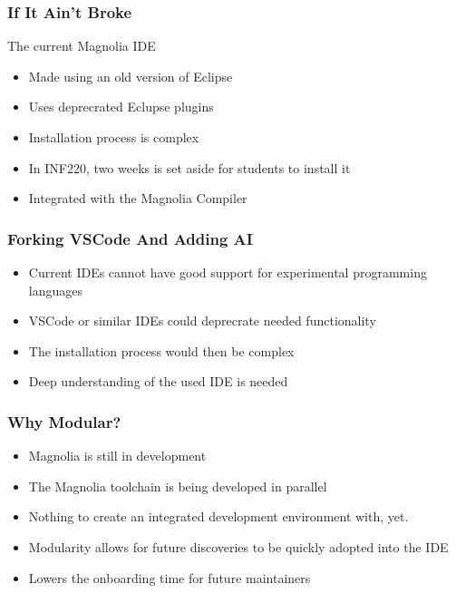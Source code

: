 \begin{frame}
    \frametitle{If It Ain't Broke}
    The current Magnolia IDE
    \begin{itemize}
        \item Made using an old version of Eclipse
        \item Uses deprecrated Eclupse plugins
        \item Installation process is complex
        \item In INF220, two weeks is set aside for students to install it
        \item Integrated with the Magnolia Compiler
    \end{itemize}
\end{frame}

\begin{frame}
  \frametitle{Forking VSCode And Adding AI}
  \begin{itemize}
    \item Current IDEs cannot have good support for experimental programming
      languages
    \item VSCode or similar IDEs could deprecrate needed functionality
    \item The installation process would then be complex
    \item Deep understanding of the used IDE is needed
  \end{itemize}
\end{frame}

\begin{frame}
  \frametitle{Why Modular?}
  \begin{itemize}
    \item Magnolia is still in development
    \item The Magnolia toolchain is being developed in parallel
    \item Nothing to create an integrated development environment with, yet.
    \item Modularity allows for future discoveries to be quickly adopted into
      the IDE
    \item Lowers the onboarding time for future maintainers
  \end{itemize}
\end{frame}
